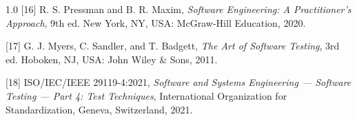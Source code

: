 \documentclass[12pt, a4paper, onecolumn, oneside]{report}
\begin{document}
\begin{spacing}{1.0}
\vspace{0.3cm}
\noindent\hangindent=1.5cm
{[16]} R. S. Pressman and B. R. Maxim, \textit{Software Engineering: A Practitioner's Approach}, 9th ed. New York, NY, USA: McGraw-Hill Education, 2020.

\vspace{0.3cm}
\noindent\hangindent=1.5cm
{[17]} G. J. Myers, C. Sandler, and T. Badgett, \textit{The Art of Software Testing}, 3rd ed. Hoboken, NJ, USA: John Wiley \& Sons, 2011.

\vspace{0.3cm}
\noindent\hangindent=1.5cm
{[18]} ISO/IEC/IEEE 29119-4:2021, \textit{Software and Systems Engineering --- Software Testing --- Part 4: Test Techniques}, International Organization for Standardization, Geneva, Switzerland, 2021.

\end{spacing}

\newpage
{}


% 

\newpage
\thispagestyle{empty}
\end{document}
